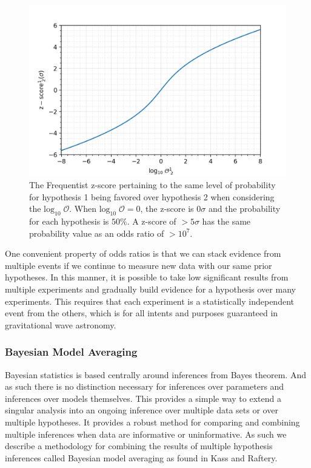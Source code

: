 \begin{figure}
  \includegraphics[width=\linewidth]{figs/chapter2/log10odds_z_score.png}
  \caption{The Frequentist z-score pertaining to the same level of probability for  hypothesis 1 being favored over hypothesis 2 when considering the $\mathrm{log}_{10} \; \mathcal{O}$. When $\mathrm{log}_{10} \; \mathcal{O} = 0$, the z-score is $0 \sigma$ and the probability for each hypothesis is $50\%$. A z-score of $>5 \sigma$ has the same probability value as an odds ratio of $> 10^7$.}
  \label{fig:log10odds_v_z_score}
\end{figure}

One convenient property of odds ratios is that we can stack evidence from multiple events if we continue to measure new data with our same prior hypotheses. In this manner, it is possible to take low significant results from multiple experiments and gradually build evidence for a hypothesis over many experiments. This requires that each experiment is a statistically independent event from the others, which is for all intents and purposes guaranteed in gravitational wave astronomy.

\subsubsection{Bayesian Model Averaging}

Bayesian statistics is based centrally around inferences from Bayes theorem. And as such there is no distinction necessary for inferences over parameters and inferences over models themselves. This provides a simple way to extend a singular analysis into an ongoing inference over multiple data sets or over multiple hypotheses. It provides a robust method for comparing and combining multiple inferences when data are informative or uninformative. As such we describe a methodology for combining the results of multiple hypothesis inferences called Bayesian model averaging as found in Kass and Raftery.

